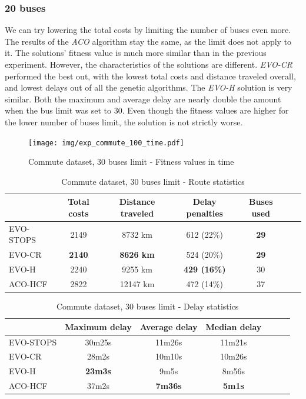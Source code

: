 \subsubsection{20 buses}

We can try lowering the total costs by limiting the number of buses even more. The results of the \textit{ACO} algorithm stay the same, as the limit does not apply to it. The solutions' fitness value is much more similar than in the previous experiment. However, the characteristics of the solutions are different. \textit{EVO-CR} performed the best out, with the lowest total costs and distance traveled overall, and lowest delays out of all the genetic algorithms. The \textit{EVO-H} solution is very similar. Both the maximum and average delay are nearly double the amount when the bus limit was set to 30. Even though the fitness values are higher for the lower number of buses limit, the solution is not strictly worse.

\clearpage

\begin{figure}
    \centering
    \texttt{[image: img/exp\_commute\_100\_time.pdf]}
    \caption{Commute dataset, 30 buses limit - Fitness values in time}
    \label{fig:exp_commute_30}
\end{figure}

\begin{table}
    \centering
    \begin{tabular}{lcccccc}
         & Total costs & Distance traveled & Delay penalties & Buses used \\
         \hline
         EVO-STOPS & 2149 & 8732 km & 612 (22\%) & \textbf{29} \\
         EVO-CR & \textbf{2140} & \textbf{8626 km} & 524 (20\%) & \textbf{29} \\
         EVO-H & 2240 & 9255 km & \textbf{429 (16\%)} & 30 \\
         ACO-HCF & 2822 & 12147 km & 472 (14\%) & 37 \\
    \end{tabular}
    \caption{Commute dataset, 30 buses limit - Route statistics}
    \label{tab:exp_commute_30_route_stats}
\end{table}

\begin{table}
    \centering
    \begin{tabular}{lcccccc}
         &  Maximum delay & Average delay & Median delay \\
         \hline
         EVO-STOPS & 30m25s & 11m26s & 11m21s \\
         EVO-CR & 28m2s & 10m10s & 10m26s \\
         EVO-H & \textbf{23m3s} & 9m5s & 8m56s \\
         ACO-HCF & 37m2s & \textbf{7m36s} & \textbf{5m1s} \\
    \end{tabular}
    \caption{Commute dataset, 30 buses limit - Delay statistics}
    \label{tab:exp_commute_30_delay_stats}
\end{table}

